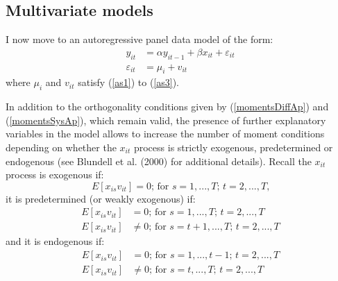 \documentclass[a4paper, 12pt]{article}
\begin{document}

\subsection*{Multivariate models}

I now move to an autoregressive panel data model of the form:
\begin{equation}
\label{modelarmul}
\tag{8'}
\begin{aligned}
y_{it}&=\alpha y_{it-1} + \beta x_{it} + \varepsilon_{it}\\
\varepsilon_{it}&=\mu _{i}+v_{it}
\end{aligned}
\end{equation}
where $\mu _{i}$ and $v_{it}$ satisfy (\ref{as1}) to (\ref{as3}).

In addition to the orthogonality conditions given by (\ref{momentsDiffAp}) and (\ref{momentsSysAp}), which remain valid, the presence of further explanatory variables in the model allows to increase the number of moment conditions depending on whether the $x_{it}$ process is strictly exogenous, predetermined or endogenous (see Blundell et al. (2000) for additional details). Recall the $x_{it}$ process is exogenous if:
\begin{equation}
\label{ruleexo}
\tag{9'}
E\left[x_{is}v_{it}\right]=0\text{; for $s=1,...,T$; $t=2,...,T$,}
\end{equation}
it is predetermined (or weakly exogenous) if:
\begin{equation}
\label{rulepre}
\tag{10'}
\begin{aligned}
E\left[x_{is}v_{it}\right]&=0\text{; for $s=1,...,T$; $t=2,...,T$}\\
E\left[x_{is}v_{it}\right]&\neq 0\text{; for $s=t+1,...,T$; $t=2,...,T$}
\end{aligned}
\end{equation}
and it is endogenous if:
\begin{equation}
\label{ruleend}
\tag{11'}
\begin{aligned}
E\left[x_{is}v_{it}\right]&=0\text{; for $s=1,...,t-1$; $t=2,...,T$}\\
E\left[x_{is}v_{it}\right]&\neq 0\text{; for $s=t,...,T$; $t=2,...,T$}
\end{aligned}
\end{equation}
\end{document}
